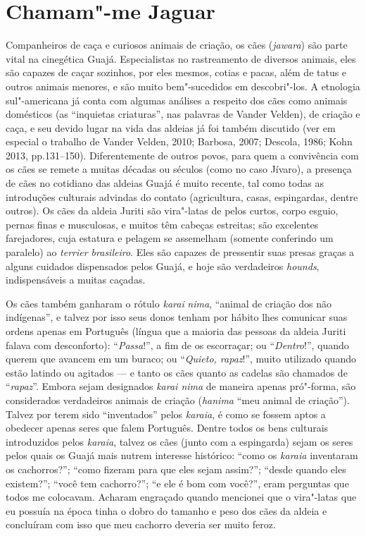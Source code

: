 \section{Chamam"-me Jaguar}\label{chamam-me-jaguar}

Companheiros de caça e curiosos animais de criação, os cães
(\emph{jawara}) são parte vital na cinegética Guajá. Especialistas no
rastreamento de diversos animais, eles são capazes de caçar sozinhos,
por eles mesmos, cotias e pacas, além de tatus e outros animais menores,
e são muito bem"-sucedidos em descobri"-los. A etnologia sul"-americana já
conta com algumas análises a respeito dos cães como animais domésticos
(as ``inquietas criaturas'', nas palavras de Vander Velden), de criação e
caça, e seu devido lugar na vida das aldeias já foi também discutido
(ver em especial o trabalho de Vander Velden, 2010; Barbosa, 2007;
Descola, 1986; Kohn 2013, pp.131--150). Diferentemente de outros povos,
para quem a convivência com os cães se remete a muitas décadas ou
séculos (como no caso Jívaro), a presença de cães no cotidiano das
aldeias Guajá é muito recente, tal como todas as introduções culturais
advindas do contato (agricultura, casas, espingardas, dentre outros). Os
cães da aldeia Juriti são vira"-latas de pelos curtos, corpo esguio,
pernas finas e musculosas, e muitos têm cabeças estreitas; são
excelentes farejadores, cuja estatura e pelagem se assemelham (somente
conferindo um paralelo) ao \emph{terrier brasileiro}. Eles são capazes
de pressentir suas presas graças a alguns cuidados dispensados pelos
Guajá, e hoje são verdadeiros \emph{hounds}, indispensáveis a muitas
caçadas.

Os cães também ganharam o rótulo \emph{karai} \emph{nima}, ``animal de
criação dos não indígenas'', e talvez por isso seus donos tenham por
hábito lhes comunicar suas ordens apenas em Português (língua que a
maioria das pessoas da aldeia Juriti falava com desconforto):
``\emph{Passa}!'', a fim de os escorraçar; ou ``\emph{Dentro}!'', quando
querem que avancem em um buraco; ou ``\emph{Quieto, rapaz}!'', muito
utilizado quando estão latindo ou agitados --- e tanto os cães quanto as
cadelas são chamados de ``\emph{rapaz}''. Embora sejam designados
\emph{karai nima} de maneira apenas pró"-forma, são considerados
verdadeiros animais de criação (\emph{hanima} ``meu animal de
criação''). Talvez por terem sido ``inventados'' pelos \emph{karaia}, é
como se fossem aptos a obedecer apenas seres que falem Português. Dentre
todos os bens culturais introduzidos pelos \emph{karaia}, talvez os cães
(junto com a espingarda) sejam os seres pelos quais os Guajá mais nutrem
interesse histórico: ``como os \emph{karaia} inventaram os cachorros?'';
``como fizeram para que eles sejam assim?''; ``desde quando eles existem?'';
``você tem cachorro?''; ``e ele é bom com você?'', eram perguntas que todos
me colocavam. Acharam engraçado quando mencionei que o vira"-latas que eu
possuía na época tinha o dobro do tamanho e peso dos cães da aldeia e
concluíram com isso que meu cachorro deveria ser muito feroz.

